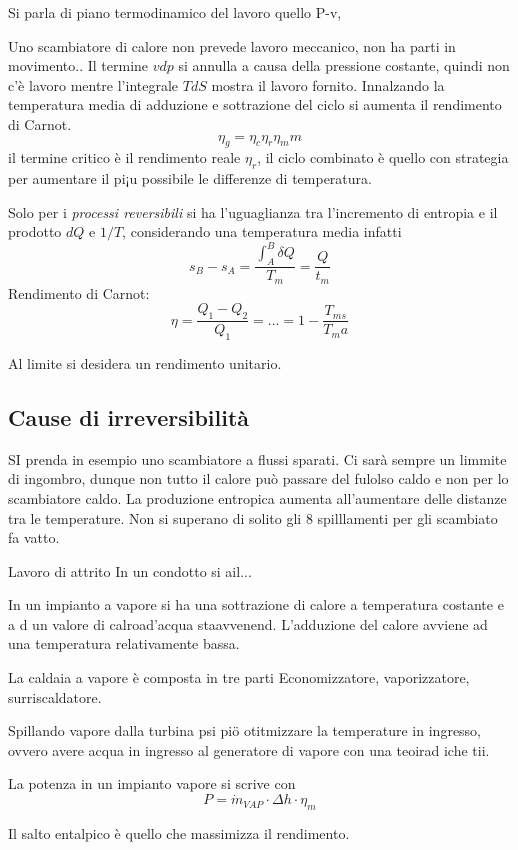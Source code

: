 Si parla di piano termodinamico del lavoro quello P-v,

Uno scambiatore di calore non prevede lavoro meccanico, non ha parti in
movimento..
Il termine $vdp$ si annulla a causa della pressione costante, quindi non c'è
lavoro mentre l'integrale $TdS$ mostra il lavoro fornito.
Innalzando la temperatura media di adduzione e sottrazione del ciclo si aumenta
il rendimento di Carnot.
$$
\eta_g = \eta_c\eta_r\eta_mm
$$
il termine critico è il rendimento reale $\eta_r$, il ciclo combinato è quello
con strategia per aumentare il pi¡u possibile le differenze di temperatura.

Solo per i \textit{processi reversibili} si ha l'uguaglianza tra l'incremento
di entropia e il prodotto $dQ$ e $1/T$, considerando una temperatura media
infatti
$$
s_B - s_A = \frac{\int_A^B \delta Q}{T_m} = \frac{Q}{t_m}
$$
Rendimento di Carnot:
\begin{equation}
\eta = \frac{Q_1-Q_2}{Q_1} = ... = 1 - \frac{T_{ms}}{T_ma}
\end{equation}


Al limite si desidera un rendimento unitario.

\subsection{Cause di irreversibilità}
SI prenda in esempio uno scambiatore a flussi
sparati.
Ci sarà sempre un limmite di ingombro, dunque non tutto il calore può passare
del fulolso caldo e non per lo scambiatore caldo.
La produzione entropica aumenta all'aumentare delle distanze tra le
temperature.
Non si superano di solito gli 8 spilllamenti per gli scambiato fa vatto.

Lavoro di attrito
In un condotto si ail...


In un impianto a vapore si ha una sottrazione di calore a temperatura costante
e a d un valore di calroad'acqua staavvenend.
L'adduzione del calore avviene ad una temperatura relativamente bassa.

La caldaia a vapore è composta in tre parti
Economizzatore, vaporizzatore, surriscaldatore.

Spillando vapore dalla turbina psi piö otitmizzare la temperature in ingresso,
ovvero avere acqua in ingresso al generatore di vapore con una teoirad iche tii.

La potenza in un impianto vapore si scrive con
$$
P = \dot{m}_{VAP}\cdot\Delta h\cdot\eta_{m}
$$

Il salto entalpico è quello che massimizza il rendimento.




